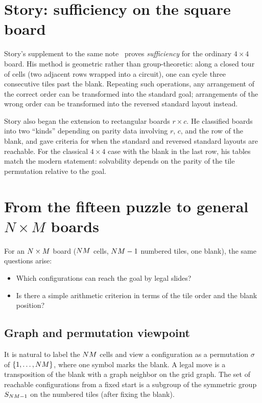 \section{Story: sufficiency on the square board}\label{sec:story}

Story's supplement to the same note~\cite{JohnsonStory1879} proves \emph{sufficiency} for the ordinary $4\times 4$ board.
His method is geometric rather than group-theoretic: along a closed tour of cells (two adjacent rows wrapped into a circuit), one can cycle three consecutive tiles past the blank.
Repeating such operations, any arrangement of the correct order can be transformed into the standard goal; arrangements of the wrong order can be transformed into the reversed standard layout instead.

Story also began the extension to rectangular boards $r\times c$.
He classified boards into two ``kinds'' depending on parity data involving $r$, $c$, and the row of the blank, and gave criteria for when the standard and reversed standard layouts are reachable.
For the classical $4\times 4$ case with the blank in the last row, his tables match the modern statement: solvability depends on the parity of the tile permutation relative to the goal.

\section{From the fifteen puzzle to general \texorpdfstring{$N\times M$}{N x M} boards}\label{sec:general-grid}

For an $N\times M$ board ($NM$ cells, $NM-1$ numbered tiles, one blank), the same questions arise:
\begin{itemize}
  \item Which configurations can reach the goal by legal slides?
  \item Is there a simple arithmetic criterion in terms of the tile order and the blank position?
\end{itemize}

\subsection{Graph and permutation viewpoint}

It is natural to label the $NM$ cells and view a configuration as a permutation $\sigma$ of $\{1,\ldots,NM\}$, where one symbol marks the blank.
A legal move is a transposition of the blank with a graph neighbor on the grid graph.
The set of reachable configurations from a fixed start is a subgroup of the symmetric group~$S_{NM-1}$ on the numbered tiles (after fixing the blank).

